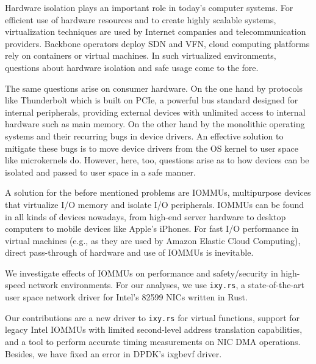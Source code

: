 \small

Hardware isolation plays an important role in today's computer systems. For
efficient use of hardware resources and to create highly scalable systems,
virtualization techniques are used by Internet companies and telecommunication
providers. Backbone operators deploy SDN and VFN, cloud computing platforms rely
on containers or virtual machines. In such virtualized environments, questions
about hardware isolation and safe usage come to the fore.

The same questions arise on consumer hardware. On the one hand by protocols like
Thunderbolt which is built on PCIe, a powerful bus standard designed for
internal peripherals, providing external devices with unlimited access to
internal hardware such as main memory. On the other hand by the monolithic
operating systems and their recurring bugs in device drivers. An effective
solution to mitigate these bugs is to move device drivers from the OS kernel to
user space like microkernels do. However, here, too, questions arise as to how
devices can be isolated and passed to user space in a safe manner.

A solution for the before mentioned problems are IOMMUs, multipurpose devices
that virtualize I/O memory and isolate I/O peripherals. IOMMUs can be found in
all kinds of devices nowadays, from high-end server hardware to desktop
computers to mobile devices like Apple's iPhones. For fast I/O performance in
virtual machines (e.g., as they are used by Amazon Elastic Cloud Computing),
direct pass-through of hardware and use of IOMMUs is inevitable.

We investigate effects of IOMMUs on performance and safety/security in
high-speed network environments. For our analyses, we use \texttt{ixy.rs}, a
state-of-the-art user space network driver for Intel's 82599 NICs written in
Rust.

Our contributions are a new driver to \texttt{ixy.rs} for virtual functions,
support for legacy Intel IOMMUs with limited second-level address translation
capabilities, and a tool to perform accurate timing measurements on NIC DMA
operations. Besides, we have fixed an error in DPDK's ixgbevf driver.

